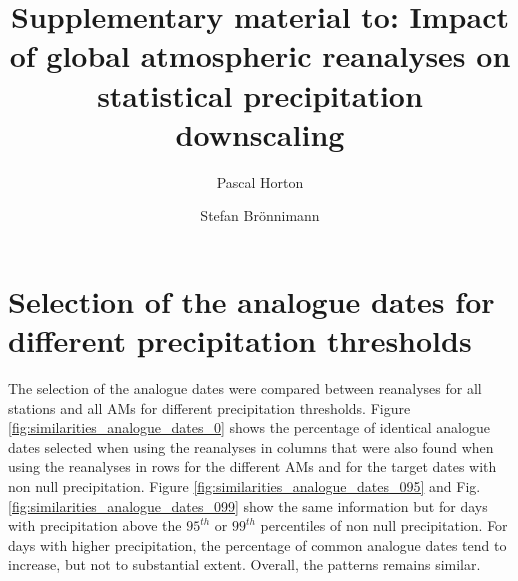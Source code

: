 \documentclass[twocolumn]{svjour3}       %
\date{}
\newcommand{\beginsupplement}{%
	\renewcommand{\thetable}{S\arabic{table}}%
	\renewcommand{\thefigure}{S\arabic{figure}}%
	\renewcommand{\thesection}{S\arabic{section}}%
}
\begin{document}
	
	\title{Supplementary material to: Impact of global atmospheric reanalyses on statistical precipitation downscaling
	}
	
	
	
	\author{Pascal Horton         \and
		Stefan Br\"{o}nnimann
	}


	
	
	
	\maketitle
	
	\beginsupplement
	

	\section{Selection of the analogue dates for different precipitation thresholds}
	\label{supp:analogue_days}
	
	The selection of the analogue dates were compared between reanalyses for all stations and all AMs for different precipitation thresholds. Figure \ref{fig:similarities_analogue_dates_0} shows the percentage of identical analogue dates selected when using the reanalyses in columns that were also found when using the reanalyses in rows for the different AMs and for the target dates with non null precipitation. Figure \ref{fig:similarities_analogue_dates_095} and Fig. \ref{fig:similarities_analogue_dates_099} show the same information but for days with precipitation above the $95^{th}$ or $99^{th}$ percentiles of non null precipitation. For days with higher precipitation, the percentage of common analogue dates tend to increase, but not to substantial extent. Overall, the patterns remains similar.	
	
\end{document}
